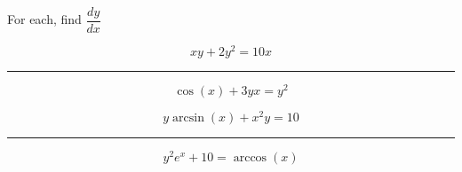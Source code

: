 \documentclass{article}
\begin{document}
\begin{landscape}
\thispagestyle{empty}
\begin{center}

{\Huge For each, find $\dfrac{dy}{dx}$}

\end{center}
\begin{multicols}{2}

{\Huge


$$
xy + 2y^2 = 10x
$$

\vspace{0.5in}
\hrule
\vspace{0.5in}

$$
\cos(x) + 3yx = y^2
$$
\columnbreak

$$
y\arcsin(x) + x^2 y = 10
$$

\vspace{0.5in}
\hrule
\vspace{0.5in}

$$
y^2 e^x + 10 = \arccos(x)
$$

}

\end{multicols}
\end{landscape}
\end{document}
